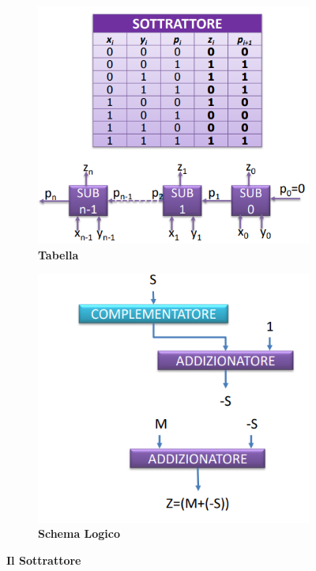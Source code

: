 \documentclass[12pt]{article}
\begin{document}
\begin{figure}[h]
    \centering
        \begin{subfigure}[b]{0.40\textwidth}
        \centering
        \includegraphics[width=\textwidth]{Sottrattore.png}
        \caption{\textbf{Tabella}}
        \label{fig:enter-label}
    \end{subfigure}
     \hfill %
     \begin{subfigure}{0.40\textwidth}
         \centering
         \includegraphics[width=\textwidth]{Schema.png}
         \caption{\textbf{Schema Logico}}
         \label{fig:enter-label}
     \end{subfigure}
    \caption{\textbf{Il Sottrattore}}
    \label{fig:main}
\end{figure}
\end{document}
